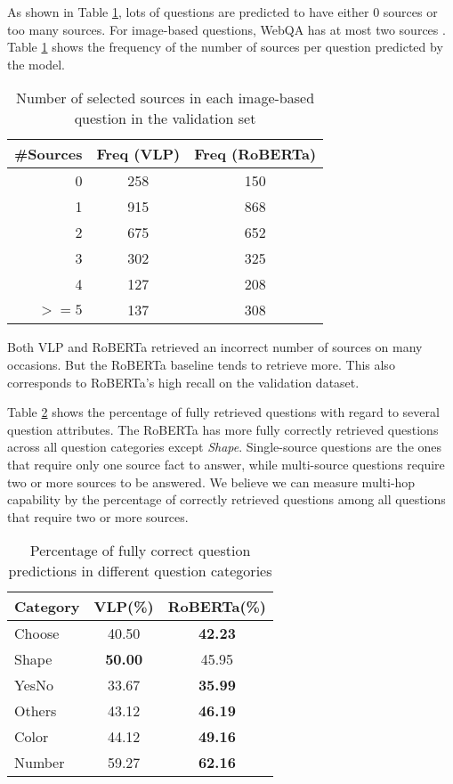 \documentclass[nohyperref]{article}
\theoremstyle{plain}
\theoremstyle{definition}
\theoremstyle{remark}
\begin{document}
As shown in Table \ref{tab:vlp_num_selected_sources}, lots of questions are predicted to have either $0$ sources or too many sources. For image-based questions, WebQA has at most two sources \cite{webqa}.
Table \ref{tab:vlp_num_selected_sources} shows the frequency of the number of sources per question predicted by the model.
\begin{table}[h]
    \centering
    \footnotesize
    \begin{tabular}{rcc}
        \toprule[1.2pt]
        \#Sources & Freq (VLP) & Freq (RoBERTa) \\
        \midrule
        0     & 258   & 150 \\
        1     & 915   & 868 \\
        2     & 675   & 652 \\
        3     & 302   & 325 \\
        4     & 127   & 208 \\
        $>=5$ & 137   & 308 \\
        \bottomrule[1.2pt]
    \end{tabular}
    \caption{Number of selected sources in each image-based question in the validation set}
    \label{tab:vlp_num_selected_sources}
    \vspace{-5pt}
\end{table}

Both VLP and RoBERTa retrieved an incorrect number of sources on many occasions.
But the RoBERTa baseline tends to retrieve more. This also corresponds to RoBERTa's high recall on the validation dataset.

Table \ref{tab:vlp_correct_attribute} shows the percentage of fully retrieved questions with regard to several question attributes.
The RoBERTa has more fully correctly retrieved questions across all question categories except \textit{Shape}.
Single-source questions are the ones that require only one source fact to answer, while multi-source questions require two or more sources to be answered.
We believe we can measure multi-hop capability by the percentage of correctly retrieved questions among all questions that require two or more sources.
\begin{table}[h]
    \centering
    \footnotesize
    \begin{tabular}{lcc}
        \toprule[1.2pt]
        Category & VLP(\%) & RoBERTa(\%) \\
        \toprule
        Choose & 40.50 & \textbf{42.23}   \\
        Shape  & \textbf{50.00} & 45.95   \\
        YesNo  & 33.67 & \textbf{35.99}   \\
        Others & 43.12 & \textbf{46.19}   \\
        Color  & 44.12 & \textbf{49.16}   \\
        Number & 59.27 & \textbf{62.16}   \\
        \bottomrule[1.2pt]
    \end{tabular}
    \caption{Percentage of fully correct question predictions in different question categories}
    \label{tab:vlp_correct_attribute}
    \vspace{-5pt}
\end{table}
\end{document}
